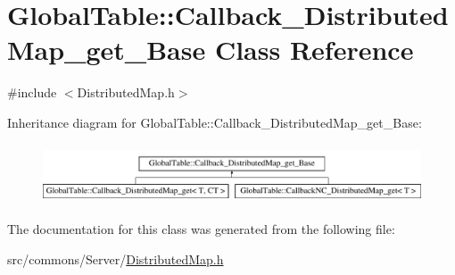 \hypertarget{class_global_table_1_1_callback___distributed_map__get___base}{
\section{GlobalTable::Callback\_\-DistributedMap\_\-get\_\-Base Class Reference}
\label{class_global_table_1_1_callback___distributed_map__get___base}
}


{\ttfamily \#include $<$DistributedMap.h$>$}

Inheritance diagram for GlobalTable::Callback\_\-DistributedMap\_\-get\_\-Base:\begin{figure}[H]
\begin{center}
\leavevmode
\includegraphics[height=1.78344cm]{class_global_table_1_1_callback___distributed_map__get___base}
\end{center}
\end{figure}


The documentation for this class was generated from the following file:\begin{DoxyCompactItemize}
\item 
src/commons/Server/\hyperlink{_distributed_map_8h}{DistributedMap.h}\end{DoxyCompactItemize}
